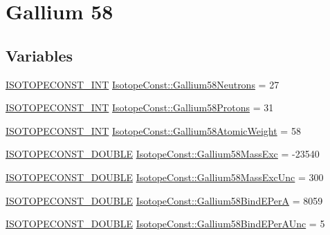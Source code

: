 \hypertarget{group___isotope_const-_gallium-_ga58}{}\section{Gallium 58}
\label{group___isotope_const-_gallium-_ga58}
\subsection*{Variables}
\begin{DoxyCompactItemize}
\item 
\mbox{\hyperlink{group___isotope_const-_macros_ga5f18360b3e99483a35c32d789e62621c}{I\+S\+O\+T\+O\+P\+E\+C\+O\+N\+S\+T\+\_\+\+I\+NT}} \mbox{\hyperlink{group___isotope_const-_gallium-_ga58_gaa1ebe4967d7e0900cf76ad3745448bbf}{Isotope\+Const\+::\+Gallium58\+Neutrons}} = 27
\item 
\mbox{\hyperlink{group___isotope_const-_macros_ga5f18360b3e99483a35c32d789e62621c}{I\+S\+O\+T\+O\+P\+E\+C\+O\+N\+S\+T\+\_\+\+I\+NT}} \mbox{\hyperlink{group___isotope_const-_gallium-_ga58_gae416d205665955004d0427132573264b}{Isotope\+Const\+::\+Gallium58\+Protons}} = 31
\item 
\mbox{\hyperlink{group___isotope_const-_macros_ga5f18360b3e99483a35c32d789e62621c}{I\+S\+O\+T\+O\+P\+E\+C\+O\+N\+S\+T\+\_\+\+I\+NT}} \mbox{\hyperlink{group___isotope_const-_gallium-_ga58_ga46229ed1275110505d9c53d6de5722d2}{Isotope\+Const\+::\+Gallium58\+Atomic\+Weight}} = 58
\item 
\mbox{\hyperlink{group___isotope_const-_macros_ga8f45a7272ce02c0b4c65c44636ed719a}{I\+S\+O\+T\+O\+P\+E\+C\+O\+N\+S\+T\+\_\+\+D\+O\+U\+B\+LE}} \mbox{\hyperlink{group___isotope_const-_gallium-_ga58_ga05578eff3dc171243620420786c773a3}{Isotope\+Const\+::\+Gallium58\+Mass\+Exc}} = -\/23540
\item 
\mbox{\hyperlink{group___isotope_const-_macros_ga8f45a7272ce02c0b4c65c44636ed719a}{I\+S\+O\+T\+O\+P\+E\+C\+O\+N\+S\+T\+\_\+\+D\+O\+U\+B\+LE}} \mbox{\hyperlink{group___isotope_const-_gallium-_ga58_gac88f62b50a6cbc84902887b2bbdccfe8}{Isotope\+Const\+::\+Gallium58\+Mass\+Exc\+Unc}} = 300
\item 
\mbox{\hyperlink{group___isotope_const-_macros_ga8f45a7272ce02c0b4c65c44636ed719a}{I\+S\+O\+T\+O\+P\+E\+C\+O\+N\+S\+T\+\_\+\+D\+O\+U\+B\+LE}} \mbox{\hyperlink{group___isotope_const-_gallium-_ga58_gaacf65394fbc156db708654bb675b5bcf}{Isotope\+Const\+::\+Gallium58\+Bind\+E\+PerA}} = 8059
\item 
\mbox{\hyperlink{group___isotope_const-_macros_ga8f45a7272ce02c0b4c65c44636ed719a}{I\+S\+O\+T\+O\+P\+E\+C\+O\+N\+S\+T\+\_\+\+D\+O\+U\+B\+LE}} \mbox{\hyperlink{group___isotope_const-_gallium-_ga58_ga01671a3b07404058dc67ed19b0c6d581}{Isotope\+Const\+::\+Gallium58\+Bind\+E\+Per\+A\+Unc}} = 5

\end{DoxyCompactItemize}
